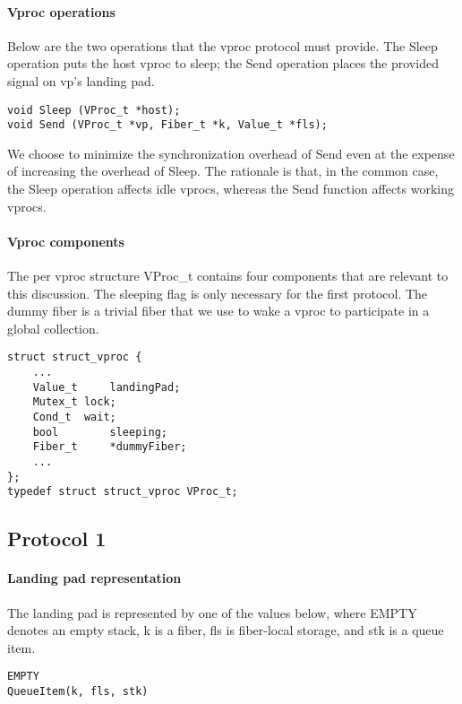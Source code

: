 \documentclass[11pt]{article}
\begin{document}
\paragraph{Vproc operations}
Below are the two operations that the vproc protocol must provide.
The Sleep operation puts the host vproc to sleep;
the Send operation places the provided signal on vp's landing pad.
\lstset{language=C}
\lstset{commentstyle=\textit}
\begin{lstlisting}
void Sleep (VProc_t *host);
void Send (VProc_t *vp, Fiber_t *k, Value_t *fls);
\end{lstlisting}
We choose to minimize the synchronization overhead of Send even at the expense of
increasing the overhead of Sleep.
The rationale is that, in the common case, the Sleep operation affects idle vprocs, whereas
the Send function affects working vprocs.

\paragraph{Vproc components}
The per vproc structure VProc\_t contains four components that are relevant to this discussion.
The sleeping flag is only necessary for the first protocol.
The dummy fiber is a trivial fiber that we use to wake a vproc to participate
in a global collection.
\lstset{language=C}
\lstset{commentstyle=\textit}
\begin{lstlisting}
struct struct_vproc {
    ...
    Value_t     landingPad;
    Mutex_t	lock;
    Cond_t	wait;
    bool        sleeping;
    Fiber_t     *dummyFiber;
    ...
};
typedef struct struct_vproc VProc_t;
\end{lstlisting}

\subsection{Protocol 1}\label{sec:protocol1}

\paragraph{Landing pad representation}
The landing pad is represented by one of the values below, where EMPTY
denotes an empty stack, k is a fiber, fls is fiber-local storage, and stk
is a queue item.
\lstset{language=C}
\lstset{commentstyle=\textit}
\begin{lstlisting}
EMPTY
QueueItem(k, fls, stk)
\end{lstlisting}
\end{document}
